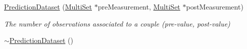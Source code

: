 \begin{DoxyCompactItemize}
\item 
\hyperlink{classPredictionDataset_a5a2d75a4affa2b76dbb631f2f79c217e}{Prediction\-Dataset} (\hyperlink{classMultiSet}{Multi\-Set} $\ast$pre\-Measurement, \hyperlink{classMultiSet}{Multi\-Set} $\ast$post\-Measurement)
\begin{DoxyCompactList}\small\item\em The number of observations associated to a couple (pre-\/value, post-\/value) \end{DoxyCompactList}\item 
\hypertarget{classPredictionDataset_a9a30fa528fa4a2507a1a0a5fe8c74269}{\hyperlink{classPredictionDataset_a9a30fa528fa4a2507a1a0a5fe8c74269}{$\sim$\-Prediction\-Dataset} ()}\label{classPredictionDataset_a9a30fa528fa4a2507a1a0a5fe8c74269}


\end{DoxyCompactItemize}
